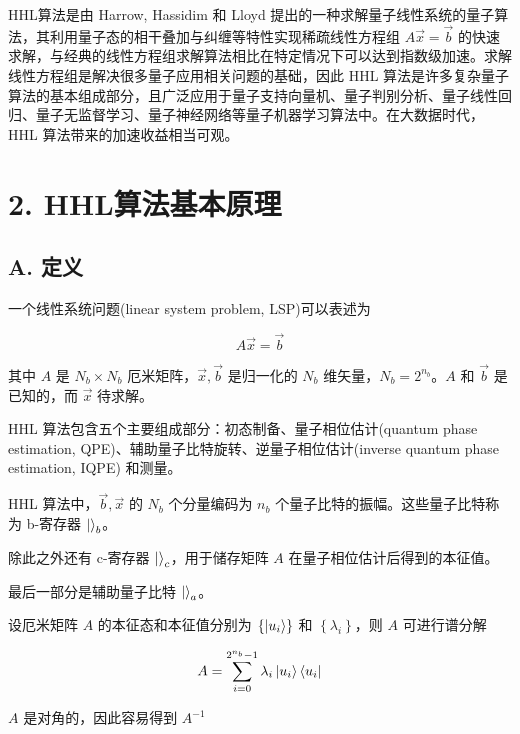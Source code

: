 \documentclass[aps,prl,twocolumn,groupedaddress]{revtex4-2}
\begin{document}
HHL算法是由 Harrow, Hassidim 和 Lloyd 提出的一种求解量子线性系统的量子算法，其利用量子态的相干叠加与纠缠等特性实现稀疏线性方程组 $A\vec{x}=\vec{b}$ 的快速求解，与经典的线性方程组求解算法相比在特定情况下可以达到指数级加速。求解线性方程组是解决很多量子应用相关问题的基础，因此 HHL 算法是许多复杂量子算法的基本组成部分，且广泛应用于量子支持向量机、量子判别分析、量子线性回归、量子无监督学习、量子神经网络等量子机器学习算法中。在大数据时代，HHL 算法带来的加速收益相当可观。

\section{2. HHL算法基本原理}

\subsection{A. 定义}

一个线性系统问题(linear system problem, LSP)可以表述为

$$
A\vec{x} = \vec{b}
$$

其中 $A $ 是  $N_b\times N_b$ 厄米矩阵，$\vec{x},\vec{b}$ 是归一化的 $N_b$ 维矢量，$N_b=2^{n_b}$。$A$ 和 $\vec{b}$ 是已知的，而 $\vec{x}$ 待求解。

HHL 算法包含五个主要组成部分：初态制备、量子相位估计(quantum phase estimation, QPE)、辅助量子比特旋转、逆量子相位估计(inverse quantum phase estimation, IQPE) 和测量。

HHL 算法中，$\vec{b},\vec{x} $ 的 $N_b$ 个分量编码为 $n_b$ 个量子比特的振幅。这些量子比特称为 b-寄存器 $\ket{}_b$。

除此之外还有 c-寄存器 $\ket{}_c$，用于储存矩阵 $A$ 在量子相位估计后得到的本征值。

最后一部分是辅助量子比特 $\ket{}_a$。

设厄米矩阵 $A$ 的本征态和本征值分别为 $\left\{\ket{u_i} \right\}$ 和 $\left\{\lambda_i \right\}$，则 $A$ 可进行谱分解

$$
A = \sum_{i=0}^{2^{n_b}-1} \lambda_i \ket{u_i}\bra{u_i}
$$

$A$ 是对角的，因此容易得到 $A^{-1}$
\end{document}
